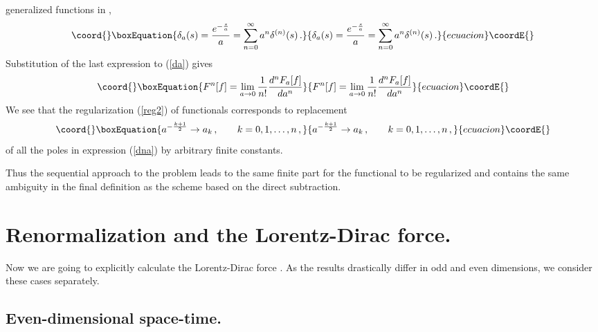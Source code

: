 \documentclass[a4paper,12pt]{article}
\begin{document}
generalized functions in \coordHE{},
\begin{equation}\coord{}\boxEquation{  \label{dela}
\delta_a(s)=\frac{e^{-\frac sa}}{a}=\sum_{n=0}^{\infty}a^n\delta^{(n)}(s)\,.
}{  \delta_a(s)=\frac{e^{-\frac sa}}{a}=\sum_{n=0}^{\infty}a^n\delta^{(n)}(s)\,.
}{ecuacion}\coordE{}\end{equation}
Substitution of the last expression to (\ref{da}) gives
\begin{equation}\coord{}\boxEquation{  \label{dna}
F^n[f]=\lim_{a\rightarrow 0}\frac1{n!}\frac{d^nF_a[f]}{da^n}
}{  F^n[f]=\lim_{a\rightarrow 0}\frac1{n!}\frac{d^nF_a[f]}{da^n}
}{ecuacion}\coordE{}\end{equation}
We see that the regularization (\ref{reg2}) of functionals \coordHE{} corresponds
to replacement
\begin{equation}\coord{}\boxEquation{  \label{rep}
a^{-\frac{k+1}{2}}\rightarrow a_k \,,\;\;\;\;\;\;\; k=0,1,\ldots, n\,,
}{  a^{-\frac{k+1}{2}}\rightarrow a_k \,,\;\;\;\;\;\;\; k=0,1,\ldots, n\,,
}{ecuacion}\coordE{}\end{equation}
of all the poles in expression (\ref{dna}) by arbitrary finite constants.

Thus the sequential approach to the problem leads to the same finite part
for the functional to be regularized and contains the same ambiguity in the
final definition as the scheme based on the direct subtraction.

\section{ Renormalization and the Lorentz-Dirac force.}

Now we are going to explicitly calculate the Lorentz-Dirac force \coordHE{}. As the results drastically differ in odd and even dimensions,
we consider these cases separately.

\subsection{ Even-dimensional space-time.}
\end{document}
